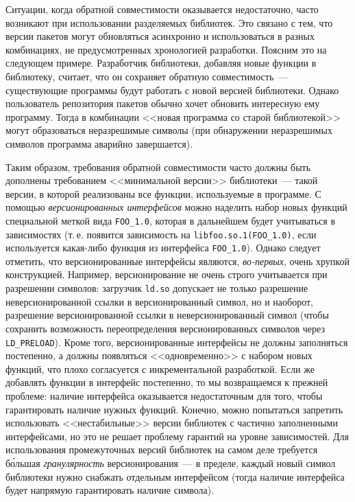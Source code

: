 \documentclass[russian,a4paper,12pt,titlepage]{article}
\begin{document}
Ситуации, когда обратной совместимости оказывается недостаточно, часто возникают при использовании разделяемых
библиотек.  Это связано с тем, что версии пакетов могут обновляться асинхронно и использоваться в разных комбинациях,
не предусмотренных хронологией разработки.  Поясним это на следующем примере.  Разработчик библиотеки, добавляя новые функции в библиотеку,
считает, что он сохраняет обратную совместимость~--- существующие программы будут работать с новой версией библиотеки.
Однако пользователь репозитория пакетов обычно хочет обновить интересную ему программу.  Тогда в комбинации <<новая программа
со старой библиотекой>> могут образоваться неразрешимые символы (при обнаружении неразрешимых символов программа аварийно завершается).

Таким образом, требования обратной совместимости часто должны быть дополнены требованием <<минимальной версии>> библиотеки~---
такой версии, в которой реализованы все функции, используемые в программе.  С помощью \emph{версионированных интерфейсов}
можно наделить набор новых функций специальной меткой вида \verb|FOO_1.0|, которая в дальнейшем будет учитываться в зависимостях
(т.\,е. появится зависимость на \verb|libfoo.so.1(FOO_1.0)|, если используется какая-либо функция из интерфейса \verb|FOO_1.0|).
Однако следует отметить, что версионированные интерфейсы являются, \emph{во-первых}, очень хрупкой конструкцией.
Например, версионирование не очень строго учитывается при разрешении символов: загрузчик \verb|ld.so| допускает не только
разрешение неверсионированной ссылки в версионированный символ, но и наоборот, разрешение версионированной ссылки в неверсионированный
символ (чтобы сохранить возможность переопределения версионированных символов через \verb|LD_PRELOAD|).  Кроме того,
версионированные интерфейсы не должны заполняться постепенно, а должны появляться <<одновременно>> с набором новых функций,
что плохо согласуется с инкрементальной разработкой.  Если же добавлять функции в интерфейс постепенно, то мы возвращаемся
к прежней проблеме: наличие интерфейса оказывается недостаточным для того, чтобы гарантировать наличие нужных функций.
Конечно, можно попытаться запретить использовать <<нестабильные>> версии библиотек с частично заполненными интерфейсами,
но это не решает проблему гарантий на уровне зависимостей.  Для использования промежуточных версий библиотек на самом деле
требуется б\'{о}льшая \emph{гранулярность} версионирования~--- в пределе, каждый новый символ библиотеки нужно снабжать
отдельным интерфейсом (тогда наличие интерфейса будет напрямую гарантировать наличие символа).
\end{document}
